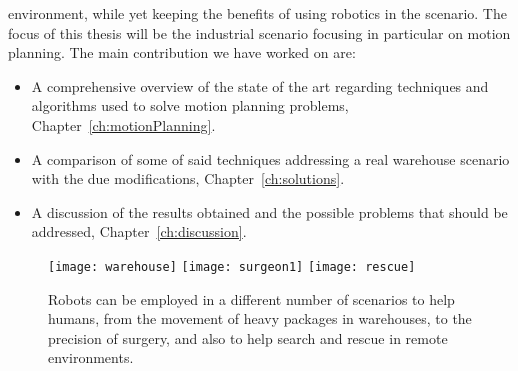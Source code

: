 environment, while yet keeping the benefits of using robotics in the scenario.
\newline
The focus of this thesis will be the industrial scenario focusing in 
particular on motion planning. The main contribution we have worked on are:
\begin{itemize}
  \item A comprehensive overview of the state of the art regarding techniques 
    and algorithms used to solve motion planning problems, 
    Chapter~\ref{ch:motionPlanning}.
  \item A comparison of some of said techniques addressing a real warehouse
    scenario with the due modifications, Chapter~\ref{ch:solutions}. 
  \item A discussion of the results obtained and the possible problems that
    should be addressed, Chapter~\ref{ch:discussion}.  
\end{itemize}
\begin{figure}[tb]
  \centering
  \texttt{[image: warehouse]}
  \texttt{[image: surgeon1]}
  \texttt{[image: rescue]}
  \caption{Robots can be employed in a different number of scenarios to help
  humans, from the movement of heavy packages in warehouses, to the precision
  of surgery, and also to help search and rescue in remote environments.}
  \label{fig:robot_examples}
\end{figure}
